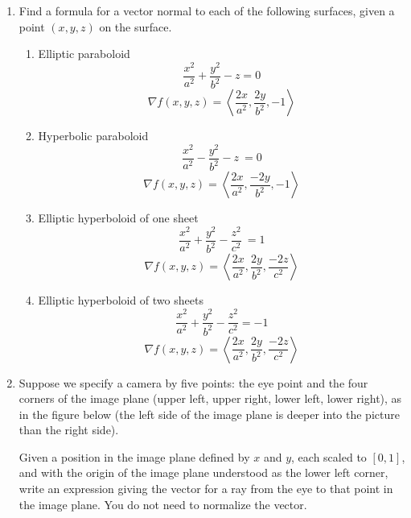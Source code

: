 \documentclass{article}
\newcommand{\vect}[1]{\left\langle #1 \right\rangle}
\begin{document}
\begin{enumerate}
  
\item Find a formula for a vector normal to each of the following
  surfaces, given a point $(x,y,z)$ on the surface.
  \begin{enumerate}
  \item Elliptic paraboloid \[\frac{x^2}{a^2} + \frac{y^2}{b^2} - z = 0\]
    \[
    \nabla f(x,y,z) = \vect{\frac{2x}{a^2}, \frac{2y}{b^2}, -1}
    \]

  \item Hyperbolic paraboloid \[\frac{x^2}{a^2} - \frac{y^2}{b^2} - z\ = 0\]
    \[
    \nabla f(x,y,z) = \vect{\frac{2x}{a^2}, \frac{-2y}{b^2}, -1}
    \]

  \item Elliptic hyperboloid of one sheet
    \[\frac{x^2}{a^2} + \frac{y^2}{b^2} - \frac{z^2}{c^2}\ = 1\]
    \[
    \nabla f(x,y,z) = \vect{\frac{2x}{a^2}, \frac{2y}{b^2}, \frac{-2z}{c^2}}
    \]

  \item Elliptic hyperboloid of two sheets
    \[ \frac{x^2}{a^2} + \frac{y^2}{b^2} - \frac{z^2}{c^2} = -1\]
    \[
    \nabla f(x,y,z) = \vect{\frac{2x}{a^2}, \frac{2y}{b^2}, \frac{-2z}{c^2}}
    \]

  \end{enumerate}

\item Suppose we specify a camera by five points: the eye point and the four corners of
  the image plane (upper left, upper right, lower left, lower right),
  as in the figure below (the left side of the image plane is deeper
  into the picture than the right side). 

    \tikzset{>=latex}

Given a position in the image plane defined by $x$ and $y$, each
scaled to $[0,1]$, and with the origin of the image plane understood
as the lower left corner, write an expression giving the vector for a
ray from the eye to that point in the image plane.  You do not need to
normalize the vector.


\end{enumerate}
\end{document}
